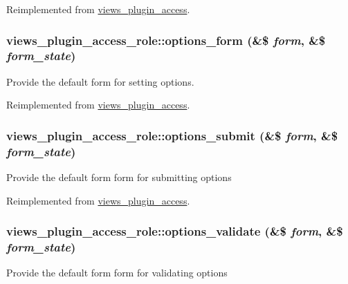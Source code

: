 Reimplemented from \hyperlink{classviews__plugin__access_a3d52dc2603a2991a46a3c212a04097d2}{views\_\-plugin\_\-access}.\hypertarget{classviews__plugin__access__role_a76293d33e84a78e2ce0df6df955da760}{
\subsubsection[{options\_\-form}]{\setlength{\rightskip}{0pt plus 5cm}views\_\-plugin\_\-access\_\-role::options\_\-form (\&\$ {\em form}, \/  \&\$ {\em form\_\-state})}}
\label{classviews__plugin__access__role_a76293d33e84a78e2ce0df6df955da760}
Provide the default form for setting options. 

Reimplemented from \hyperlink{classviews__plugin__access_a530865442ea42db5e720e6c49f3d16f2}{views\_\-plugin\_\-access}.\hypertarget{classviews__plugin__access__role_ad9bf6eddd91a7c224fb813a58077ee4d}{
\subsubsection[{options\_\-submit}]{\setlength{\rightskip}{0pt plus 5cm}views\_\-plugin\_\-access\_\-role::options\_\-submit (\&\$ {\em form}, \/  \&\$ {\em form\_\-state})}}
\label{classviews__plugin__access__role_ad9bf6eddd91a7c224fb813a58077ee4d}
Provide the default form form for submitting options 

Reimplemented from \hyperlink{classviews__plugin__access_ad0610dfaa0e225c5d2cd85c7a13287fd}{views\_\-plugin\_\-access}.\hypertarget{classviews__plugin__access__role_a82fda91cd55acbbcac1759448c8fc471}{
\subsubsection[{options\_\-validate}]{\setlength{\rightskip}{0pt plus 5cm}views\_\-plugin\_\-access\_\-role::options\_\-validate (\&\$ {\em form}, \/  \&\$ {\em form\_\-state})}}
\label{classviews__plugin__access__role_a82fda91cd55acbbcac1759448c8fc471}
Provide the default form form for validating options 

